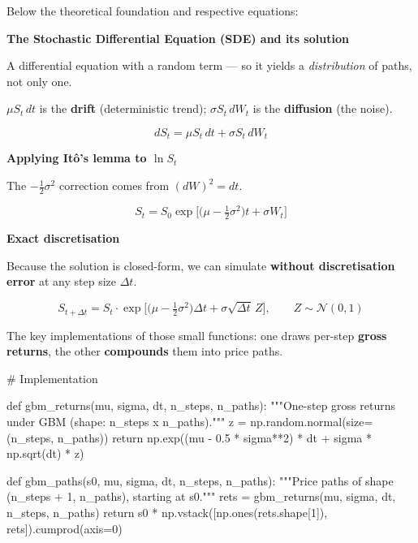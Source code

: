 \documentclass{pyportfolios-note}
\begin{document}
\noteneedroom{200bp}

Below the theoretical foundation and respective equations:

\begin{notebullets}
\item \textbf{The Stochastic Differential Equation (SDE) and its solution}
      \begin{notesubbullets}
      \item A differential equation with a random term — so it yields a
            \textit{distribution} of paths, not only one.
      \item $\mu S_t\,dt$ is the \textbf{drift} (deterministic trend);
            $\sigma S_t\,dW_t$ is the \textbf{diffusion} (the noise).
      \end{notesubbullets}
      \[ dS_t = \mu S_t\,dt + \sigma S_t\,dW_t \]
\item \textbf{Applying Itô's lemma to $\ln S_t$}
      \begin{notesubbullets}
      \item The $-\tfrac{1}{2}\sigma^2$ correction comes from $(dW)^2 = dt$.
      \end{notesubbullets}
      \[ S_t = S_0 \exp\!\Big[\big(\mu - \tfrac{1}{2}\sigma^2\big)t + \sigma W_t\Big] \]
\item \textbf{Exact discretisation}
      \begin{notesubbullets}
      \item Because the solution is closed-form, we can simulate
            \textbf{without discretisation error} at any step size $\Delta t$.
      \end{notesubbullets}
      \[ S_{t+\Delta t} = S_t \cdot
         \exp\!\Big[\big(\mu - \tfrac{1}{2}\sigma^2\big)\Delta t
         + \sigma \sqrt{\Delta t}\, Z\Big], \qquad Z \sim \mathcal{N}(0,1) \]
\end{notebullets}

The key implementations of those small functions: one draws per-step
\textbf{gross returns}, the other \textbf{compounds} them into price paths.

\begin{notecode}
# Implementation

def gbm_returns(mu, sigma, dt, n_steps, n_paths):
    """One-step gross returns under GBM (shape: n_steps x n_paths)."""
    z = np.random.normal(size=(n_steps, n_paths))
    return np.exp((mu - 0.5 * sigma**2) * dt + sigma * np.sqrt(dt) * z)

def gbm_paths(s0, mu, sigma, dt, n_steps, n_paths):
    """Price paths of shape (n_steps + 1, n_paths), starting at s0."""
    rets = gbm_returns(mu, sigma, dt, n_steps, n_paths)
    return s0 * np.vstack([np.ones(rets.shape[1]), rets]).cumprod(axis=0)
\end{notecode}
\end{document}
